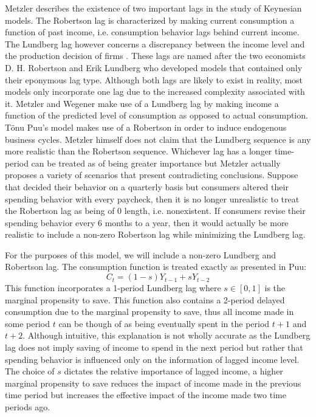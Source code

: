 Metzler describes the existence of two important lags in the study of Keynesian models. The Robertson lag is characterized by making current consumption a function of past income, i.e. consumption behavior lags behind current income. The Lundberg lag however concerns a discrepancy between the income level and the production decision of firms \autocite{Metzler1941} . These lags are named after the two economists D. H. Robertson and Erik Lundberg who developed models that contained only their eponymous lag type. Although both lags are likely to exist in reality, most models only incorporate one lag due to the increased complexity associated with it. Metzler and Wegener make use of a Lundberg lag by making income a function of the predicted level of consumption as opposed to actual consumption. T\"{o}nu Puu's model makes use of a Robertson in order to induce endogenous business cycles. Metzler himself does not claim that the Lundberg sequence is any more realistic than the Robertson sequence. Whichever lag has a longer time-period can be treated as of being greater importance but Metzler actually proposes a variety of scenarios that present contradicting conclusions. Suppose that decided their behavior on a quarterly basis but consumers altered their spending behavior with every paycheck, then it is no longer unrealistic to treat the Robertson lag as being of 0 length, i.e. nonexistent. If consumers revise their spending behavior every 6 months to a year, then it would actually be more realistic to include a non-zero Robertson lag while minimizing the Lundberg lag. 

For the purposes of this model, we will include a non-zero Lundberg and Robertson lag. The consumption function is treated exactly as presented in Puu:
\begin{equation}
    C_t=(1-s)Y_{t-1}+sY_{t-2}
\end{equation}
This function incorporates a 1-period Lundberg lag where $s\in[0,1]$ is the marginal propensity to save. This function also contains a 2-period delayed consumption due to the marginal propensity to save, thus all income made in some period $t$ can be though of as being eventually spent in the period $t+1$ and $t+2$. Although intuitive, this explanation is not wholly accurate as the Lundberg lag does not imply saving of income to spend in the next period but rather that spending behavior is influenced only on the information of lagged income level. The choice of $s$ dictates the relative importance of lagged income, a higher marginal propensity to save reduces the impact of income made in the previous time period but increases the effective impact of the income made two time periods ago.  

